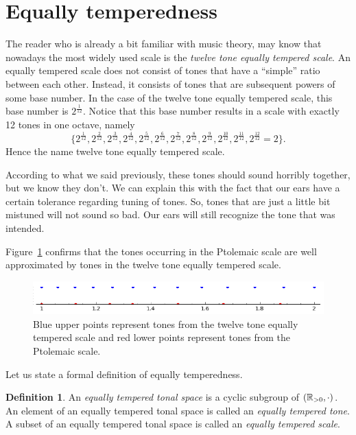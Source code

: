 \documentclass[a4paper]{book}
\theoremstyle{definition}
\newtheorem{definition}[theorem]{Definition}
\begin{document}
\section{Equally temperedness}
\label{section_equally_temperedness}
The reader who is already a bit familiar with music theory, may know that nowadays the most widely used scale is the \emph{twelve tone equally tempered scale}.
An equally tempered scale does not consist of tones that have a ``simple'' ratio between each other.
Instead, it consists of tones that are subsequent powers of some base number.
In the case of the twelve tone equally tempered scale, this base number is $2^\frac{1}{12}$.
Notice that this base number results in a scale with exactly 12 tones in one octave, namely \[\{2^\frac{1}{12},2^\frac{2}{12},2^\frac{3}{12},2^\frac{4}{12},2^\frac{5}{12},2^\frac{6}{12},2^\frac{7}{12},2^\frac{8}{12},2^\frac{9}{12},2^\frac{10}{12},2^\frac{11}{12}, 2^\frac{12}{12} = 2\}.\]
Hence the name twelve tone equally tempered scale.

According to what we said previously, these tones should sound horribly together, but we know they don't.
We can explain this with the fact that our ears have a certain tolerance regarding tuning of tones.
So, tones that are just a little bit mistuned will not sound so bad.
Our ears will still recognize the tone that was intended.

Figure~\ref{equally_temperedness} confirms that the tones occurring in the Ptolemaic scale are well approximated by tones in the twelve tone equally tempered scale.

\begin{figure}[H]
    \centering
    \includegraphics[scale=0.65]{figures/equally_temperedness.png}
    \caption{Blue upper points represent tones from the twelve tone equally tempered scale and red lower points represent tones from the Ptolemaic scale.}
    \label{equally_temperedness}
\end{figure}

Let us state a formal definition of equally temperedness.

\begin{definition}
    An \emph{equally tempered tonal space} is a cyclic subgroup of $(\mathbb{R}_{> 0},\cdot)$.
    An element of an equally tempered tonal space is called an \emph{equally tempered tone}.
    A subset of an equally tempered tonal space is called an \emph{equally tempered scale}.
\end{definition}
\end{document}

